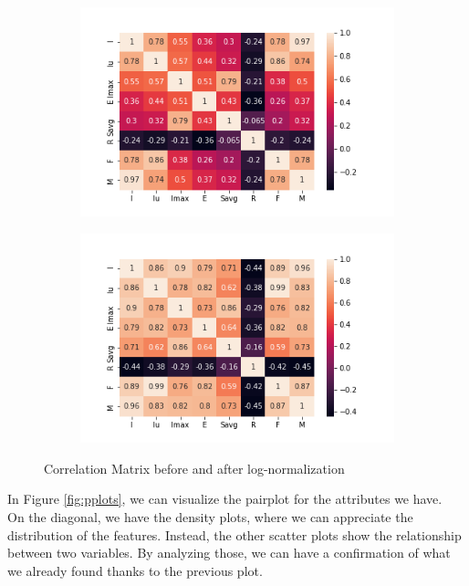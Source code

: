 \begin{figure}
\begin{subfigure}{.49\textwidth}
\centering
\includegraphics[width=.95\textwidth]{img/preparation/features_corr.png}
\label{fig:features_corr}
\end{subfigure}
\begin{subfigure}{.49\textwidth}
\centering
\captionsetup{justification=centering}
\includegraphics[width=.95\textwidth]{img/preparation/features_corr_logs.png}
\label{fig:features_corr_logs}
\end{subfigure}
\caption{Correlation Matrix before and after log-normalization}
\end{figure}

In Figure \ref{fig:pplots}, we can visualize the pairplot for the attributes we have.\\
On the diagonal, we have the density plots, where we can appreciate the distribution of the features. Instead, the other scatter plots show the relationship between two variables. By analyzing those, we can have a confirmation of what we already found thanks to the previous plot. 

